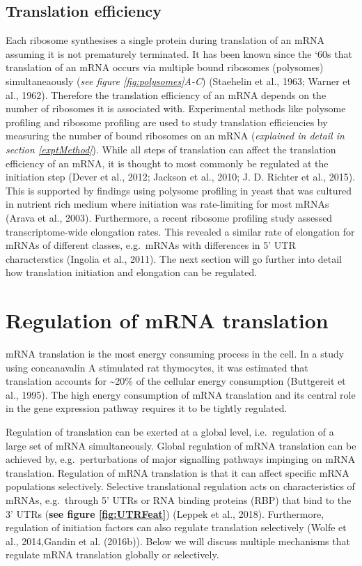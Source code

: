 \documentclass[12pt,openany]{book}
\begin{document}
\subsection{Translation efficiency}

Each ribosome synthesises a single protein during translation of an mRNA
assuming it is not prematurely terminated. It has been known since the
`60s that translation of an mRNA occurs via multiple bound ribosomes
(polysomes) simultaneaously (\emph{see figure \ref{fig:polysomes}A-C})
(Staehelin et al., 1963; Warner et al., 1962). Therefore the translation
efficiency of an mRNA depends on the number of ribosomes it is
associated with. Experimental methods like polysome profiling and
ribosome profiling are used to study translation efficiencies by
measuring the number of bound ribosomes on an mRNA (\emph{explained in
detail in section \ref{exptMethod}}). While all steps of translation can
affect the translation efficiency of an mRNA, it is thought to most
commonly be regulated at the initiation step (Dever et al., 2012;
Jackson et al., 2010; J. D. Richter et al., 2015). This is supported by
findings using polysome profiling in yeast that was cultured in nutrient
rich medium where initiation was rate-limiting for most mRNAs (Arava et
al., 2003). Furthermore, a recent ribosome profiling study assessed
transcriptome-wide elongation rates. This revealed a similar rate of
elongation for mRNAs of different classes, e.g.~mRNAs with differences
in 5' UTR characterstics (Ingolia et al., 2011). The next section will
go further into detail how translation initiation and elongation can be
regulated. \newline
\section{Regulation of mRNA translation} \label{regmRNA}

mRNA translation is the most energy consuming process in the cell. In a
study using concanavalin A stimulated rat thymocytes, it was estimated
that translation accounts for \textasciitilde{}20\% of the cellular
energy consumption (Buttgereit et al., 1995). The high energy
consumption of mRNA translation and its central role in the gene
expression pathway requires it to be tightly regulated.

Regulation of translation can be exerted at a global level,
i.e.~regulation of a large set of mRNA simultaneously. Global regulation
of mRNA translation can be achieved by, e.g.~perturbations of major
signalling pathways impinging on mRNA translation. Regulation of mRNA
translation is that it can affect specific mRNA populations selectively.
Selective translational regulation acts on characteristics of mRNAs,
e.g.~through 5' UTRs or RNA binding proteins (RBP) that bind to the 3'
UTRs (\textbf{see figure \ref{fig:UTRFeat}}) (Leppek et al., 2018).
Furthermore, regulation of initiation factors can also regulate
translation selectively (Wolfe et al., 2014,Gandin et al. (2016b)).
Below we will discuss multiple mechanisms that regulate mRNA translation
globally or selectively.
\end{document}
